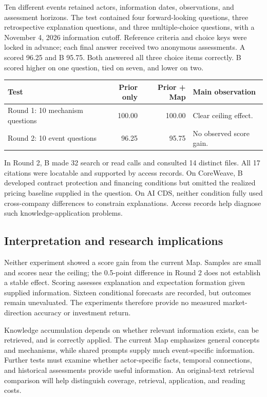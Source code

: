 \documentclass[11pt,letterpaper]{article}
\begin{document}
Ten different events retained actors, information dates, observations, and assessment horizons. The test contained four forward-looking questions, three retrospective explanation questions, and three multiple-choice questions, with a November 4, 2026 information cutoff. Reference criteria and choice keys were locked in advance; each final answer received two anonymous assessments. A scored 96.25 and B 95.75. Both answered all three choice items correctly. B scored higher on one question, tied on seven, and lower on two.

\begin{center}
\small
\begin{tabularx}{\textwidth}{@{}YrrL{0.28\textwidth}@{}}
\toprule
Test & Prior only & Prior + Map & Main observation \\
\midrule
Round 1: 10 mechanism questions & 100.00 & 100.00 & Clear ceiling effect. \\
Round 2: 10 event questions & 96.25 & 95.75 & No observed score gain. \\
\bottomrule
\end{tabularx}
\end{center}

In Round 2, B made 32 search or read calls and consulted 14 distinct files. All 17 citations were locatable and supported by access records. On CoreWeave, B developed contract protection and financing conditions but omitted the realized pricing baseline supplied in the question. On AI CDS, neither condition fully used cross-company differences to constrain explanations. Access records help diagnose such knowledge-application problems.

\subsection{Interpretation and research implications}

Neither experiment showed a score gain from the current Map. Samples are small and scores near the ceiling; the 0.5-point difference in Round 2 does not establish a stable effect. Scoring assesses explanation and expectation formation given supplied information. Sixteen conditional forecasts are recorded, but outcomes remain unevaluated. The experiments therefore provide no measured market-direction accuracy or investment return.

Knowledge accumulation depends on whether relevant information exists, can be retrieved, and is correctly applied. The current Map emphasizes general concepts and mechanisms, while shared prompts supply much event-specific information. Further tests must examine whether actor-specific facts, temporal connections, and historical assessments provide useful information. An original-text retrieval comparison will help distinguish coverage, retrieval, application, and reading costs.
\end{document}
